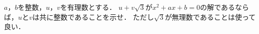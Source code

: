 $a$，$b$を整数，$u$，$v$を有理数とする．
$u+v\sqrt{3}$が$x^2+ax+b=0$の解であるならば，$u$と$v$は共に整数であることを示せ．
ただし$\sqrt{3}$が無理数であることは使って良い．
